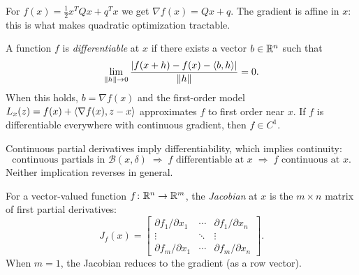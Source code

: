 \begin{example}
	For $f(x) = \frac{1}{2} x^T Q x + q^T x$ we get $\nabla f(x) = Qx + q$.
	The gradient is affine in $x$: this is what makes quadratic optimization tractable.
\end{example}

\begin{definition}[Differentiability]\label{def:differentiable}
	A function $f$ is \emph{differentiable} at $x$ if there exists a vector $b \in \mathbb{R}^n$ such that
	\begin{equation}\label{eq:differentiability}
		\lim_{\lVert h\rVert \to 0} \frac{\lvert f(x + h) - f(x) - \langle b, h\rangle\rvert}{\lVert h\rVert} = 0.
	\end{equation}
	When this holds, $b = \nabla f(x)$ and the first-order model $L_x(z) = f(x) + \langle\nabla f(x), z - x\rangle$ approximates $f$ to first order near $x$.
	If $f$ is differentiable everywhere with continuous gradient, then $f \in C^1$.
\end{definition}

\begin{theorem}\label{thm:cont-diff}
	Continuous partial derivatives imply differentiability, which implies continuity:
	\begin{equation}\label{eq:regularity-chain}
		\text{continuous partials in } \mathcal{B}(x, \delta)
		\;\Rightarrow\;
		f \text{ differentiable at } x
		\;\Rightarrow\;
		f \text{ continuous at } x.
	\end{equation}
	Neither implication reverses in general.
\end{theorem}

\begin{definition}[Jacobian]\label{def:jacobian}
	For a vector-valued function $f \colon \mathbb{R}^n \to \mathbb{R}^m$, the \emph{Jacobian} at $x$ is the $m \times n$ matrix of first partial derivatives:
	\begin{equation}\label{eq:jacobian}
		J_f(x) = \begin{bmatrix}
			\partial f_1/\partial x_1 & \cdots & \partial f_1/\partial x_n \\
			\vdots & \ddots & \vdots \\
			\partial f_m/\partial x_1 & \cdots & \partial f_m/\partial x_n
		\end{bmatrix}.
	\end{equation}
	When $m = 1$, the Jacobian reduces to the gradient (as a row vector).
\end{definition}

